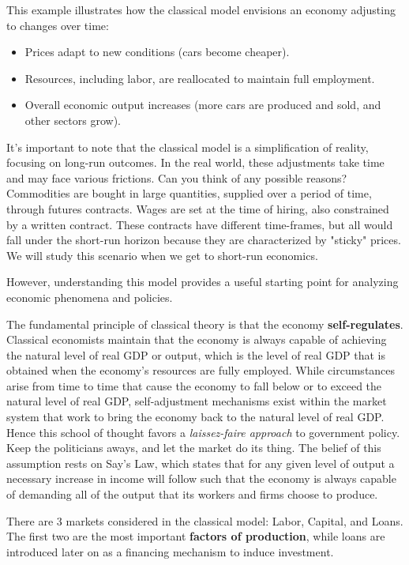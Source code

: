 \documentclass[10pt]{article}
\begin{document}
This example illustrates how the classical model envisions an economy adjusting to changes over time:

\begin{itemize}
  \item Prices adapt to new conditions (cars become cheaper).
  \item Resources, including labor, are reallocated to maintain full employment.
  \item Overall economic output increases (more cars are produced and sold, and other sectors grow).
\end{itemize}

It's important to note that the classical model is a simplification of reality, focusing on long-run outcomes. In the real world, these adjustments take time and may face various frictions. Can you think of any possible reasons? Commodities are bought in large quantities, supplied over a period of time, through futures contracts. Wages are set at the time of hiring, also constrained by a written contract. These contracts have different time-frames, but all would fall under the short-run horizon because they are characterized by "sticky" prices. We will study this scenario when we get to short-run economics.

However, understanding this model provides a useful starting point for analyzing economic phenomena and policies.

The fundamental principle of classical theory is that the economy \textbf{self-regulates}. Classical economists maintain that the economy is always capable of achieving the natural level of real GDP or output, which is the level of real GDP that is obtained when the economy's resources are fully employed. While circumstances arise from time to time that cause the economy to fall below or to exceed the natural level of real GDP, self-adjustment mechanisms exist within the market system that work to bring the economy back to the natural level of real GDP. Hence this school of thought favors a \textit{laissez-faire approach} to government policy. Keep the politicians aways, and let the market do its thing. The belief of this assumption rests on Say's Law, which states that for any given level of output a necessary increase in income will follow such that the economy is always capable of demanding all of the output that its workers and firms choose to produce.

There are 3 markets considered in the classical model: Labor, Capital, and Loans. The first two are the most important \textbf{factors of production}, while loans are introduced later on as a financing mechanism to induce investment.
\end{document}
